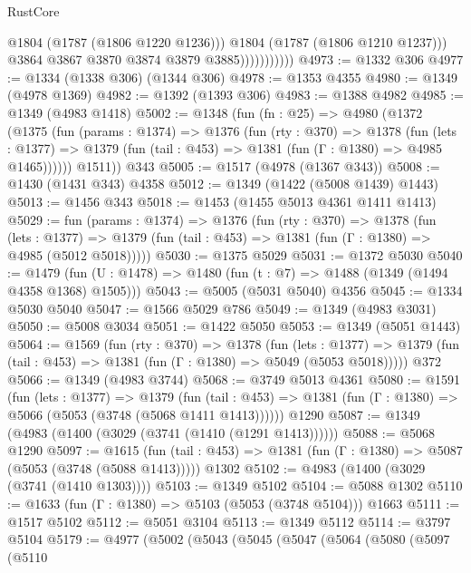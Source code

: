 \begin{lexlean}{RustCore}
\begin{coremodule}
                              @1804
                              (@1787 (@1806 @1220 @1236)))
                            @1804
                            (@1787 (@1806 @1210 @1237)))
                          @3864
                          @3867
                          @3870
                          @3874
                          @3879
                          @3885)))))))))))
@4973 := @1332 @306
@4977 := @1334 (@1338 @306) (@1344 @306)
@4978 := @1353 @4355
@4980 := @1349 (@4978 @1369)
@4982 := @1392 (@1393 @306)
@4983 := @1388 @4982
@4985 := @1349 (@4983 @1418)
@5002 := @1348
    (fun (fn : @25) =>
    @4980
      (@1372
        (@1375
          (fun (params : @1374) =>
          @1376
            (fun (rty : @370) =>
            @1378
              (fun (lets : @1377) =>
              @1379 (fun (tail : @453) => @1381 (fun (Γ : @1380) => @4985 @1465))))))
        @1511))
    @343
@5005 := @1517 (@4978 (@1367 @343))
@5008 := @1430 (@1431 @343) @4358
@5012 := @1349 (@1422 (@5008 @1439) @1443)
@5013 := @1456 @343
@5018 := @1453 (@1455 @5013 @4361 @1411 @1413)
@5029 := fun (params : @1374) =>
  @1376
    (fun (rty : @370) =>
    @1378
      (fun (lets : @1377) =>
      @1379 (fun (tail : @453) => @1381 (fun (Γ : @1380) => @4985 (@5012 @5018)))))
@5030 := @1375 @5029
@5031 := @1372 @5030
@5040 := @1479 (fun (U : @1478) => @1480 (fun (t : @7) => @1488 (@1349 (@1494 @4358 @1368) @1505)))
@5043 := @5005 (@5031 @5040) @4356
@5045 := @1334 @5030 @5040
@5047 := @1566 @5029 @786
@5049 := @1349 (@4983 @3031)
@5050 := @5008 @3034
@5051 := @1422 @5050
@5053 := @1349 (@5051 @1443)
@5064 := @1569
    (fun (rty : @370) =>
    @1378
      (fun (lets : @1377) =>
      @1379 (fun (tail : @453) => @1381 (fun (Γ : @1380) => @5049 (@5053 @5018)))))
    @372
@5066 := @1349 (@4983 @3744)
@5068 := @3749 @5013 @4361
@5080 := @1591
    (fun (lets : @1377) =>
    @1379
      (fun (tail : @453) => @1381 (fun (Γ : @1380) => @5066 (@5053 (@3748 (@5068 @1411 @1413))))))
    @1290
@5087 := @1349 (@4983 (@1400 (@3029 (@3741 (@1410 (@1291 @1413))))))
@5088 := @5068 @1290
@5097 := @1615
    (fun (tail : @453) => @1381 (fun (Γ : @1380) => @5087 (@5053 (@3748 (@5088 @1413)))))
    @1302
@5102 := @4983 (@1400 (@3029 (@3741 (@1410 @1303))))
@5103 := @1349 @5102
@5104 := @5088 @1302
@5110 := @1633 (fun (Γ : @1380) => @5103 (@5053 (@3748 @5104))) @1663
@5111 := @1517 @5102
@5112 := @5051 @3104
@5113 := @1349 @5112
@5114 := @3797 @5104
@5179 := @4977
    (@5002
      (@5043
        (@5045
          (@5047
            (@5064
              (@5080
                (@5097
                  (@5110

\end{coremodule}
\end{lexlean}
